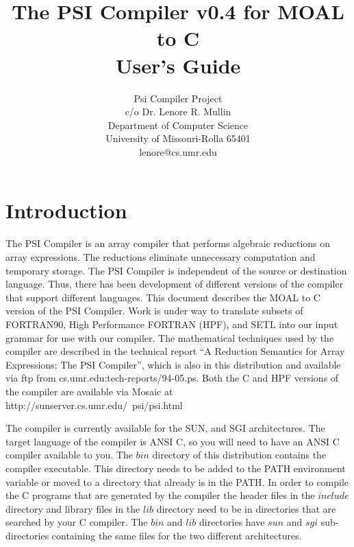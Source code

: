 
\addtolength{\topmargin}{-.75in}
\addtolength{\textwidth}{1.6in}
\setlength{\textheight}{8.75in}
\addtolength{\oddsidemargin}{-0.75in}
\addtolength{\evensidemargin}{-0.75in}
\setlength{\parskip}{.1in}

\title{The PSI Compiler v0.4 for MOAL to C\\User's Guide}
\author{Psi Compiler Project \\
c/o Dr. Lenore R. Mullin \\
Department of Computer Science\\
University of Missouri-Rolla 65401 \\
lenore@cs.umr.edu}


\maketitle
\tableofcontents

\section{Introduction}
The PSI Compiler is an array compiler that performs algebraic reductions on
array expressions.  The reductions eliminate unnecessary computation and 
temporary storage.  The PSI Compiler is independent of the source or 
destination language.  Thus, there has been development of different versions
of the compiler that support different languages.
This document describes the MOAL to C version of the PSI Compiler.
Work is under way to translate subsets
of FORTRAN90, High Performance FORTRAN (HPF), and SETL into our input grammar 
for use with our compiler.  The mathematical techniques used by the compiler 
are described in the technical report ``A Reduction Semantics for Array 
Expressions: The PSI Compiler'', which is also in this distribution and
available via ftp from cs.umr.edu:tech-reports/94-05.ps.  Both the
C and HPF versions of the compiler are available via Mosaic at
http://sunserver.cs.umr.edu/~psi/psi.html

The compiler is currently available for the SUN, and SGI architectures.  The 
target language of the compiler is ANSI C, so you will need to have an ANSI
C compiler available to you.  The $bin$ directory of this distribution contains
the compiler executable.  This directory needs to be added to the PATH 
environment variable or moved to a directory that already is in the PATH.  In 
order to compile the
C programs that are generated by the compiler the header files in the 
$include$ directory and library files in the $lib$ directory need to be in 
directories that are searched by your C compiler.  The $bin$ and $lib$ 
directories have $sun$ and $sgi$ sub-directories containing the same files
for the two different architectures.


